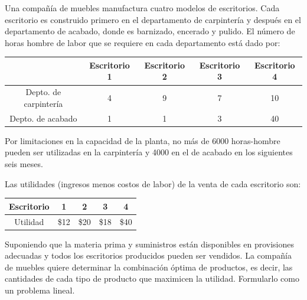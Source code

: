 \begin{Ejer}
Una compa\~n\'ia de muebles manufactura cuatro modelos de escritorios. Cada escritorio es construido primero en el departamento de carpinter\'ia y despu\'es en el departamento de acabado, donde es barnizado, encerado y pulido. El n\'umero de horas hombre de labor que se requiere en cada departamento est\'a dado por:

\begin{center}
\begin{tabular}{c|cccc}
 & Escritorio 1 & Escritorio 2 & Escritorio 3 & Escritorio 4 \\
\hline
Depto. de carpinter\'ia & 4 & 9 & 7 & 10 \\
Depto. de acabado & 1 & 1 & 3 & 40 \\
\end{tabular}
\end{center}

Por limitaciones en la capacidad de la planta, no m\'as de 6000 horas-hombre pueden ser utilizadas en la carpinter\'ia y 4000 en el de acabado en los siguientes seis meses.

Las utilidades (ingresos menos costos de labor) de la venta de cada escritorio son:

\begin{center}
\begin{tabular}{c|cccc}
Escritorio & 1 & 2 & 3 & 4 \\
\hline
Utilidad & \$12 & \$20 & \$18 & \$40 \\
\end{tabular}
\end{center}

Suponiendo que la materia prima y suministros est\'an disponibles en provisiones adecuadas y todos los escritorios producidos pueden ser vendidos. La compa\~n\'ia de muebles quiere determinar la combinaci\'on \'optima de productos, es decir, las cantidades de cada tipo de producto que maximicen la utilidad. Formularlo como un problema lineal.
\end{Ejer}


